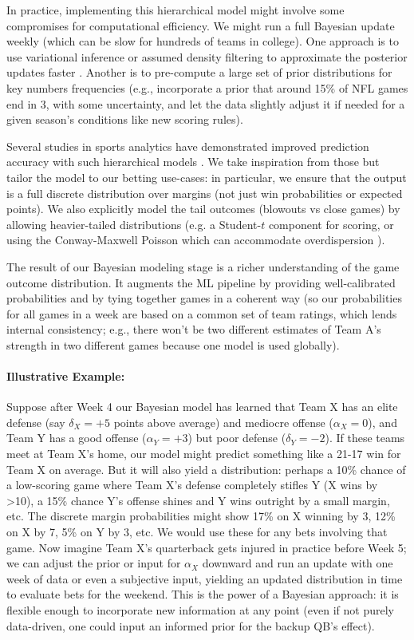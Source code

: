 \documentclass[12pt]{article}
\begin{document}
In practice, implementing this hierarchical model might involve some compromises for computational efficiency. We might run a full Bayesian update weekly (which can be slow for hundreds of teams in college). One approach is to use variational inference or assumed density filtering to approximate the posterior updates faster \cite{Macri2025}. Another is to pre-compute a large set of prior distributions for key numbers frequencies (e.g., incorporate a prior that around 15\% of NFL games end in 3, with some uncertainty, and let the data slightly adjust it if needed for a given season’s conditions like new scoring rules).

Several studies in sports analytics have demonstrated improved prediction accuracy with such hierarchical models \cite{Egidi2018, Owen2011}. We take inspiration from those but tailor the model to our betting use-cases: in particular, we ensure that the output is a full discrete distribution over margins (not just win probabilities or expected points). We also explicitly model the tail outcomes (blowouts vs close games) by allowing heavier-tailed distributions (e.g. a Student-$t$ component for scoring, or using the Conway-Maxwell Poisson which can accommodate overdispersion \cite{Karlis2009}). 

The result of our Bayesian modeling stage is a richer understanding of the game outcome distribution. It augments the ML pipeline by providing well-calibrated probabilities and by tying together games in a coherent way (so our probabilities for all games in a week are based on a common set of team ratings, which lends internal consistency; e.g., there won’t be two different estimates of Team A’s strength in two different games because one model is used globally). 

\paragraph{Illustrative Example:} Suppose after Week 4 our Bayesian model has learned that Team X has an elite defense (say $\delta_{X} = +5$ points above average) and mediocre offense ($\alpha_X = 0$), and Team Y has a good offense ($\alpha_Y = +3$) but poor defense ($\delta_Y = -2$). If these teams meet at Team X’s home, our model might predict something like a 21-17 win for Team X on average. But it will also yield a distribution: perhaps a 10\% chance of a low-scoring game where Team X’s defense completely stifles Y (X wins by >10), a 15\% chance Y’s offense shines and Y wins outright by a small margin, etc. The discrete margin probabilities might show 17\% on X winning by 3, 12\% on X by 7, 5\% on Y by 3, etc. We would use these for any bets involving that game. Now imagine Team X’s quarterback gets injured in practice before Week 5; we can adjust the prior or input for $\alpha_X$ downward and run an update with one week of data or even a subjective input, yielding an updated distribution in time to evaluate bets for the weekend. This is the power of a Bayesian approach: it is flexible enough to incorporate new information at any point (even if not purely data-driven, one could input an informed prior for the backup QB’s effect).
\end{document}
